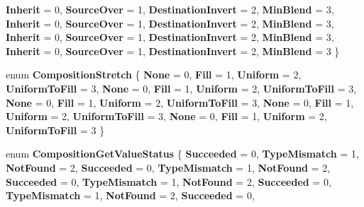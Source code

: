 \begin{DoxyCompactItemize}
\newline
{\bfseries Inherit} = 0, 
{\bfseries Source\+Over} = 1, 
{\bfseries Destination\+Invert} = 2, 
{\bfseries Min\+Blend} = 3, 
\newline
{\bfseries Inherit} = 0, 
{\bfseries Source\+Over} = 1, 
{\bfseries Destination\+Invert} = 2, 
{\bfseries Min\+Blend} = 3, 
\newline
{\bfseries Inherit} = 0, 
{\bfseries Source\+Over} = 1, 
{\bfseries Destination\+Invert} = 2, 
{\bfseries Min\+Blend} = 3, 
\newline
{\bfseries Inherit} = 0, 
{\bfseries Source\+Over} = 1, 
{\bfseries Destination\+Invert} = 2, 
{\bfseries Min\+Blend} = 3
 \}
\item 
\mbox{\label{namespace_windows_1_1_u_i_1_1_composition_abe147aa23cb612204b73bb75dc3137e8}} 
enum {\bfseries Composition\+Stretch} \{ \newline
{\bfseries None} = 0, 
{\bfseries Fill} = 1, 
{\bfseries Uniform} = 2, 
{\bfseries Uniform\+To\+Fill} = 3, 
\newline
{\bfseries None} = 0, 
{\bfseries Fill} = 1, 
{\bfseries Uniform} = 2, 
{\bfseries Uniform\+To\+Fill} = 3, 
\newline
{\bfseries None} = 0, 
{\bfseries Fill} = 1, 
{\bfseries Uniform} = 2, 
{\bfseries Uniform\+To\+Fill} = 3, 
\newline
{\bfseries None} = 0, 
{\bfseries Fill} = 1, 
{\bfseries Uniform} = 2, 
{\bfseries Uniform\+To\+Fill} = 3, 
\newline
{\bfseries None} = 0, 
{\bfseries Fill} = 1, 
{\bfseries Uniform} = 2, 
{\bfseries Uniform\+To\+Fill} = 3
 \}
\item 
\mbox{\label{namespace_windows_1_1_u_i_1_1_composition_a9ddfa4d3a911ddf582cee8e20b4e8748}} 
enum {\bfseries Composition\+Get\+Value\+Status} \{ \newline
{\bfseries Succeeded} = 0, 
{\bfseries Type\+Mismatch} = 1, 
{\bfseries Not\+Found} = 2, 
{\bfseries Succeeded} = 0, 
\newline
{\bfseries Type\+Mismatch} = 1, 
{\bfseries Not\+Found} = 2, 
{\bfseries Succeeded} = 0, 
{\bfseries Type\+Mismatch} = 1, 
\newline
{\bfseries Not\+Found} = 2, 
{\bfseries Succeeded} = 0, 
{\bfseries Type\+Mismatch} = 1, 
{\bfseries Not\+Found} = 2, 
\newline
{\bfseries Succeeded} = 0, 

\end{DoxyCompactItemize}
